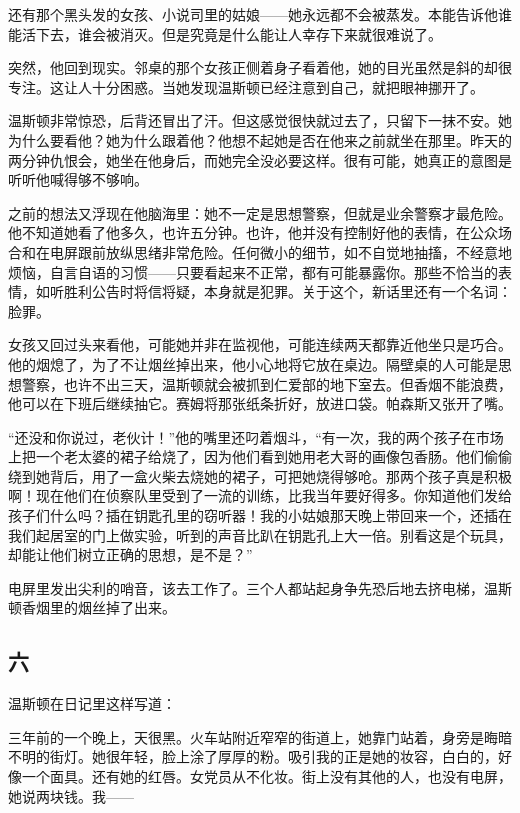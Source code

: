 还有那个黑头发的女孩、小说司里的姑娘------她永远都不会被蒸发。本能告诉他谁能活下去，谁会被消灭。但是究竟是什么能让人幸存下来就很难说了。

突然，他回到现实。邻桌的那个女孩正侧着身子看着他，她的目光虽然是斜的却很专注。这让人十分困惑。当她发现温斯顿已经注意到自己，就把眼神挪开了。

温斯顿非常惊恐，后背还冒出了汗。但这感觉很快就过去了，只留下一抹不安。她为什么要看他？她为什么跟着他？他想不起她是否在他来之前就坐在那里。昨天的两分钟仇恨会，她坐在他身后，而她完全没必要这样。很有可能，她真正的意图是听听他喊得够不够响。

之前的想法又浮现在他脑海里：她不一定是思想警察，但就是业余警察才最危险。他不知道她看了他多久，也许五分钟。也许，他并没有控制好他的表情，在公众场合和在电屏跟前放纵思绪非常危险。任何微小的细节，如不自觉地抽搐，不经意地烦恼，自言自语的习惯------只要看起来不正常，都有可能暴露你。那些不恰当的表情，如听胜利公告时将信将疑，本身就是犯罪。关于这个，新话里还有一个名词：脸罪。

女孩又回过头来看他，可能她并非在监视他，可能连续两天都靠近他坐只是巧合。他的烟熄了，为了不让烟丝掉出来，他小心地将它放在桌边。隔壁桌的人可能是思想警察，也许不出三天，温斯顿就会被抓到仁爱部的地下室去。但香烟不能浪费，他可以在下班后继续抽它。赛姆将那张纸条折好，放进口袋。帕森斯又张开了嘴。

``还没和你说过，老伙计！''他的嘴里还叼着烟斗，``有一次，我的两个孩子在市场上把一个老太婆的裙子给烧了，因为他们看到她用老大哥的画像包香肠。他们偷偷绕到她背后，用了一盒火柴去烧她的裙子，可把她烧得够呛。那两个孩子真是积极啊！现在他们在侦察队里受到了一流的训练，比我当年要好得多。你知道他们发给孩子们什么吗？插在钥匙孔里的窃听器！我的小姑娘那天晚上带回来一个，还插在我们起居室的门上做实验，听到的声音比趴在钥匙孔上大一倍。别看这是个玩具，却能让他们树立正确的思想，是不是？''

电屏里发出尖利的哨音，该去工作了。三个人都站起身争先恐后地去挤电梯，温斯顿香烟里的烟丝掉了出来。

\subsection{六}\label{ux516d}

温斯顿在日记里这样写道：

三年前的一个晚上，天很黑。火车站附近窄窄的街道上，她靠门站着，身旁是晦暗不明的街灯。她很年轻，脸上涂了厚厚的粉。吸引我的正是她的妆容，白白的，好像一个面具。还有她的红唇。女党员从不化妆。街上没有其他的人，也没有电屏，她说两块钱。我------

